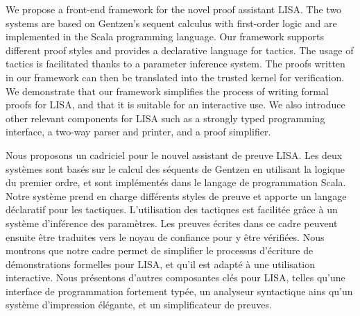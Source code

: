 \newenvironment{abstractpage}
  {\cleardoublepage\vspace*{\fill}\thispagestyle{empty}}
  {\vfill\cleardoublepage}
\newenvironment{i18nabstract}[1]
  {\bigskip\selectlanguage{#1}%
   \begin{center}\bfseries\abstractname\end{center}}
  {\par\bigskip}

\begin{abstractpage}
\begin{i18nabstract}{english}
  We propose a front-end framework for the novel proof assistant LISA. The two systems are based on Gentzen's sequent calculus with first-order logic and are implemented in the Scala programming language. Our framework supports different proof styles and provides a declarative language for tactics. The usage of tactics is facilitated thanks to a parameter inference system. The proofs written in our framework can then be translated into the trusted kernel for verification. We demonstrate that our framework simplifies the process of writing formal proofs for LISA, and that it is suitable for an interactive use. We also introduce other relevant components for LISA such as a strongly typed programming interface, a two-way parser and printer, and a proof simplifier.
\end{i18nabstract}

\begin{i18nabstract}{french}
  Nous proposons un cadriciel pour le nouvel assistant de preuve LISA. Les deux systèmes sont basés sur le calcul des séquents de Gentzen en utilisant la logique du premier ordre, et sont implémentés dans le langage de programmation Scala. Notre système prend en charge différents styles de preuve et apporte un langage déclaratif pour les tactiques. L'utilisation des tactiques est facilitée grâce à un système d'inférence des paramètres. Les preuves écrites dans ce cadre peuvent ensuite être traduites vers le noyau de confiance pour y être vérifiées. Nous montrons que notre cadre permet de simplifier le processus d'écriture de démonstrations formelles pour LISA, et qu'il est adapté à une utilisation interactive. Nous présentons d'autres composantes clés pour LISA, telles qu'une interface de programmation fortement typée, un analyseur syntactique ains qu'un système d'impression élégante, et un simplificateur de preuves.
\end{i18nabstract}
\end{abstractpage}
